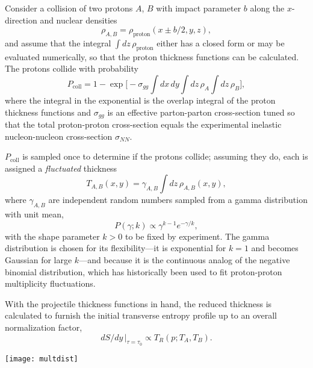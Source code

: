 \documentclass[aps,prc,reprint,amsmath,nofootinbib]{revtex4-1}
\newcommand{\trento}{T\raisebox{-.5ex}{R}ENTo}
\begin{document}
Consider a collision of two protons $A$, $B$ with impact parameter $b$ along the $x$-direction and nuclear densities
\begin{equation}
  \rho_{A,B} = \rho_\text{proton}(x \pm b/2, y, z),
\end{equation}
and assume that the integral $\int dz \, \rho_\text{proton}$ either has a closed form or may be evaluated numerically, so that the proton thickness functions can be calculated.
The protons collide with probability \cite{dEnterria:2010hd}
\begin{equation}
  P_\text{coll} = 1 - \exp\biggl[ -\sigma_{gg} \int dx \, dy \int dz \, \rho_A \int dz \, \rho_B \biggr],
  \label{eq:pcoll}
\end{equation}
where the integral in the exponential is the overlap integral of the proton thickness functions and
$\sigma_{gg}$ is an effective parton-parton cross-section tuned so that the total proton-proton
cross-section equals the experimental inelastic nucleon-nucleon cross-section $\sigma_{NN}$.

$P_\text{coll}$ is sampled once to determine if the protons collide; assuming they do, each is assigned a \emph{fluctuated} thickness
\begin{equation}
  T_{A,B}(x, y) = \gamma_{A,B} \int dz \, \rho_{A,B}(x, y),
\end{equation}
where $\gamma_{A,B}$ are independent random numbers sampled from a gamma distribution with unit mean,
\begin{equation}
  P(\gamma; k) \propto \gamma^{k-1} e^{-\gamma/k},
\end{equation}
with the shape parameter $k > 0$ to be fixed by experiment.  The gamma distribution is chosen for its
flexibility---it is exponential for $k = 1$ and becomes Gaussian for large $k$---and because it is the
continuous analog of the negative binomial distribution, which has historically been used to fit proton-proton
multiplicity fluctuations.

With the projectile thickness functions in hand, the reduced thickness is calculated to furnish the initial transverse entropy profile up to an overall normalization factor,
\begin{equation}
dS/dy \, |_{\tau = \tau_0} \propto T_R(p; T_A, T_B).
\end{equation}

\begin{figure*}[t]
  \texttt{[image: multdist]}
  \caption{
    \label{fig:multdist}
    Multiplicity distributions for proton-proton, proton-lead, and lead-lead collisions.  The blue histograms
    are \protect\trento\ results from $10^6$ minimum-bias events for each collision system, all with reduced
    thickness parameter $p = 0$ (geometric mean) and gamma fluctuation parameter $k = 0.8$.  The normalization
    constants indicated in the legends are tuned to match the experimental distributions
    (points with error bars) from ALICE \cite{}.
  }
\end{figure*}
\end{document}

